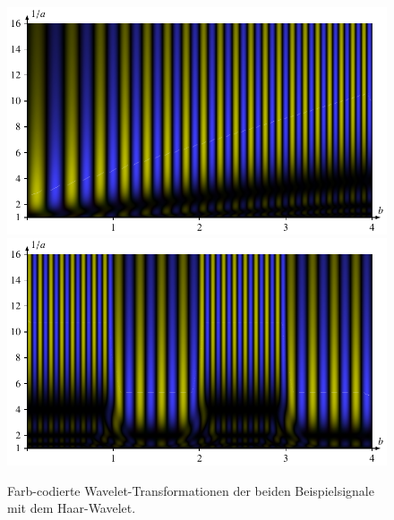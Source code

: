 \begin{figure}
	\centering
	\includegraphics{papers/complex/images/chirp_haar.pdf}
	\includegraphics{papers/complex/images/square_haar.pdf}
	\caption{Farb-codierte Wavelet-Transformationen der beiden Beispielsignale mit dem Haar-Wavelet.}
	\label{complex:haar-ex}
\end{figure}
